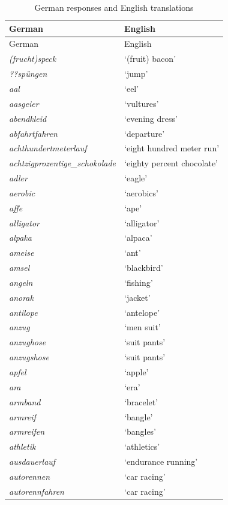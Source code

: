 \begin{longtable}{ll}
\caption{German responses and English translations}\label{tab:translations}\\
\toprule
German & English \\
\midrule
\endfirsthead
\toprule
German & English \\
\midrule
\endhead
\textit{(frucht)speck} & `(fruit) bacon' \\
\textit{??spüngen} & `jump' \\
\textit{aal} & `eel' \\
\textit{aasgeier} & `vultures' \\
\textit{abendkleid} & `evening dress' \\
\textit{abfahrtfahren} & `departure' \\
\textit{achthundertmeterlauf} & `eight hundred meter run' \\
\textit{achtzigprozentige\_schokolade} & `eighty percent chocolate' \\
\textit{adler} & `eagle' \\
\textit{aerobic} & `aerobics' \\
\textit{affe} & `ape' \\
\textit{alligator} & `alligator' \\
\textit{alpaka} & `alpaca' \\
\textit{ameise} & `ant' \\
\textit{amsel} & `blackbird' \\
\textit{angeln} & `fishing' \\
\textit{anorak} & `jacket' \\
\textit{antilope} & `antelope' \\
\textit{anzug} & `men suit' \\
\textit{anzughose} & `suit pants' \\
\textit{anzugshose} & `suit pants' \\
\textit{apfel} & `apple' \\
\textit{ara} & `era' \\
\textit{armband} & `bracelet' \\
\textit{armreif} & `bangle' \\
\textit{armreifen} & `bangles' \\
\textit{athletik} & `athletics' \\
\textit{ausdauerlauf} & `endurance running' \\
\textit{autorennen} & `car racing' \\
\textit{autorennfahren} & `car racing' \\

\end{longtable}
